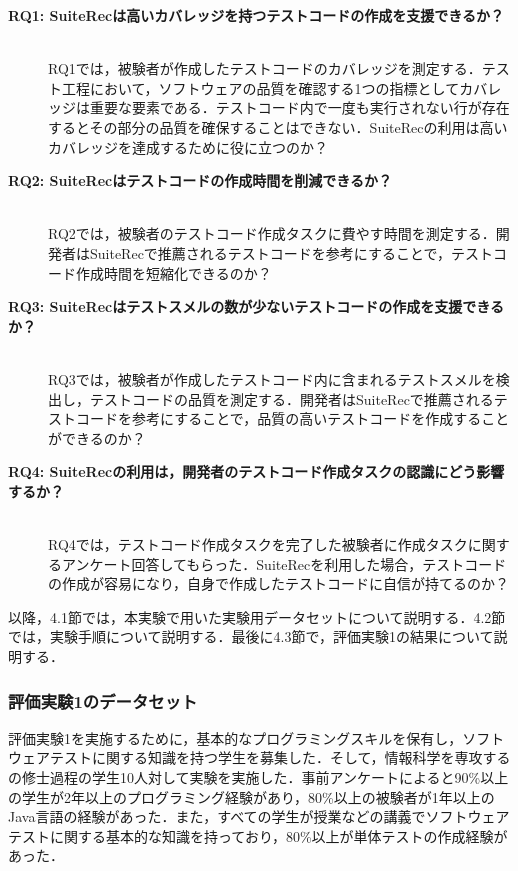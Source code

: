 \documentclass[12pt]{jarticle} %
\begin{document}
\begin{description}
\item[\textbf{RQ1: {\sf SuiteRec}は高いカバレッジを持つテストコードの作成を支援できるか？}]~\\
RQ1では，被験者が作成したテストコードのカバレッジを測定する．テスト工程において，ソフトウェアの品質を確認する1つの指標としてカバレッジは重要な要素である．テストコード内で一度も実行されない行が存在するとその部分の品質を確保することはできない．{\sf SuiteRec}の利用は高いカバレッジを達成するために役に立つのか？
\item[\textbf{RQ2: {\sf SuiteRec}はテストコードの作成時間を削減できるか？}]~\\
RQ2では，被験者のテストコード作成タスクに費やす時間を測定する．開発者は{\sf SuiteRec}で推薦されるテストコードを参考にすることで，テストコード作成時間を短縮化できるのか？
\item[\textbf{RQ3: {\sf SuiteRec}はテストスメルの数が少ないテストコードの作成を支援できるか？}]~\\
RQ3では，被験者が作成したテストコード内に含まれるテストスメルを検出し，テストコードの品質を測定する．開発者は{\sf SuiteRec}で推薦されるテストコードを参考にすることで，品質の高いテストコードを作成することができるのか？
\item[\textbf{RQ4: {\sf SuiteRec}の利用は，開発者のテストコード作成タスクの認識にどう影響するか？}]~\\
RQ4では，テストコード作成タスクを完了した被験者に作成タスクに関するアンケート回答してもらった．{\sf SuiteRec}を利用した場合，テストコードの作成が容易になり，自身で作成したテストコードに自信が持てるのか？
\end{description}

以降，4.1節では，本実験で用いた実験用データセットについて説明する．4.2節では，実験手順について説明する．最後に4.3節で，評価実験1の結果について説明する．


\subsubsection{評価実験1のデータセット}


評価実験1を実施するために，基本的なプログラミングスキルを保有し，ソフトウェアテストに関する知識を持つ学生を募集した．そして，情報科学を専攻するの修士過程の学生10人対して実験を実施した．事前アンケートによると90\%以上の学生が2年以上のプログラミング経験があり，80\%以上の被験者が1年以上のJava言語の経験があった．また，すべての学生が授業などの講義でソフトウェアテストに関する基本的な知識を持っており，80\%以上が単体テストの作成経験があった．
\end{document}
